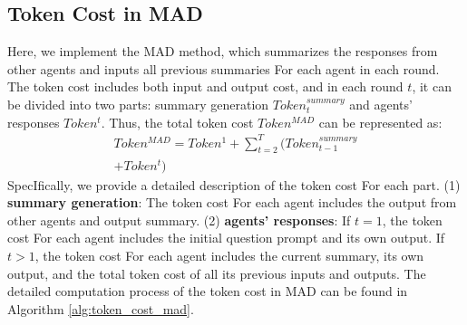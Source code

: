 \subsection{Token Cost in MAD} \label{appendix:token-cost-mad}
Here, we implement the MAD method, which summarizes the responses from other agents and inputs all previous summaries For each agent in each round. The token cost includes both input and output cost, and in each round $t$, it can be divided into two parts: summary generation $Token^{summary}_{t}$ and agents' responses $Token^t$. Thus, the total token cost $Token^{MAD}$ can be represented as:
\begin{equation}
\begin{aligned}
Token^{MAD} = Token^{1} + \sum_{t=2}^{T} (Token^{summary}_{t-1}\\
+Token^{t})
\end{aligned}
\end{equation}
SpecIfically, we provide a detailed description of the token cost For each part. (1) \textbf{summary generation}: The token cost For each agent includes the output from other agents and output summary. (2) \textbf{agents' responses}: If $t=1$, the token cost For each agent includes the initial question prompt and its own output. If $t>1$, the token cost For each agent includes the current summary, its own output, and the total token cost of all its previous inputs and outputs. The detailed computation process of the token cost in MAD can be found in Algorithm \ref{alg:token_cost_mad}.
